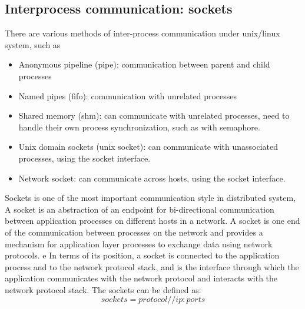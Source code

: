 \documentclass[11pt]{book}
\begin{document}
\subsection{Interprocess communication: sockets}
There are various methods of inter-process communication under unix/linux system, such as
\begin{itemize}
    \item Anonymous pipeline (pipe): communication between parent and child processes
    \item Named pipes (fifo): communication with unrelated processes
    \item Shared memory (shm): can communicate with unrelated processes, need to handle their own process synchronization, such as with semaphore.
	\item Unix domain sockets (unix socket): can communicate with unassociated processes, using the socket interface.
	\item Network socket: can communicate across hosts, using the socket interface.
\end{itemize}
Sockets is one of the most important communication style in distributed system,
A socket is an abstraction of an endpoint for bi-directional communication between application processes on different hosts in a network. A socket is one end of the communication between processes on the network and provides a mechanism for application layer processes to exchange data using network protocols.
e In terms of its position, a socket is connected to the application process and to the network protocol stack, and is the interface through which the application communicates with the network protocol and interacts with the network protocol stack. 
The sockets can be defined as:
\begin{equation}
	sockets = protocol//ip:ports
\end{equation}
\end{document}
